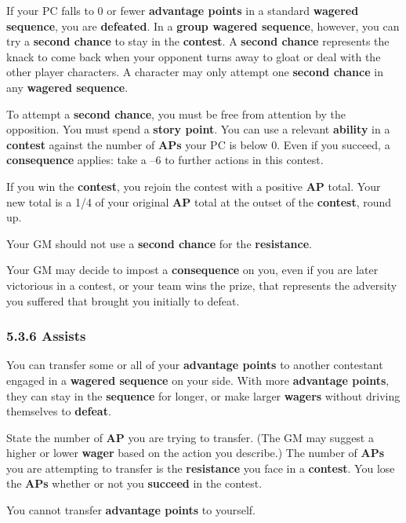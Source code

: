 \documentclass[
  11pt,
]{article}
\begin{document}
If your PC falls to 0 or fewer \textbf{advantage points} in a standard
\textbf{wagered sequence}, you are \textbf{defeated}. In a \textbf{group
wagered sequence}, however, you can try a \textbf{second chance} to stay
in the \textbf{contest}. A \textbf{second chance} represents the knack
to come back when your opponent turns away to gloat or deal with the
other player characters. A character may only attempt one \textbf{second
chance} in any \textbf{wagered sequence}.

To attempt a \textbf{second chance}, you must be free from attention by
the opposition. You must spend a \textbf{story point}. You can use a
relevant \textbf{ability} in a \textbf{contest} against the number of
\textbf{APs} your PC is below 0. Even if you succeed, a
\textbf{consequence} applies: take a --6 to further actions in this
contest.

If you win the \textbf{contest}, you rejoin the contest with a positive
\textbf{AP} total. Your new total is a 1/4 of your original \textbf{AP}
total at the outset of the \textbf{contest}, round up.

Your GM should not use a \textbf{second chance} for the
\textbf{resistance}.

Your GM may decide to impost a \textbf{consequence} on you, even if you
are later victorious in a contest, or your team wins the prize, that
represents the adversity you suffered that brought you initially to
defeat.

\hypertarget{assists-2}{%
\subsubsection{5.3.6 Assists}\label{assists-2}}

You can transfer some or all of your \textbf{advantage points} to
another contestant engaged in a \textbf{wagered sequence} on your side.
With more \textbf{advantage points}, they can stay in the
\textbf{sequence} for longer, or make larger \textbf{wagers} without
driving themselves to \textbf{defeat}.

State the number of \textbf{AP} you are trying to transfer. (The GM may
suggest a higher or lower \textbf{wager} based on the action you
describe.) The number of \textbf{APs} you are attempting to transfer is
the \textbf{resistance} you face in a \textbf{contest}. You lose the
\textbf{APs} whether or not you \textbf{succeed} in the contest.

You cannot transfer \textbf{advantage points} to yourself.
\end{document}
